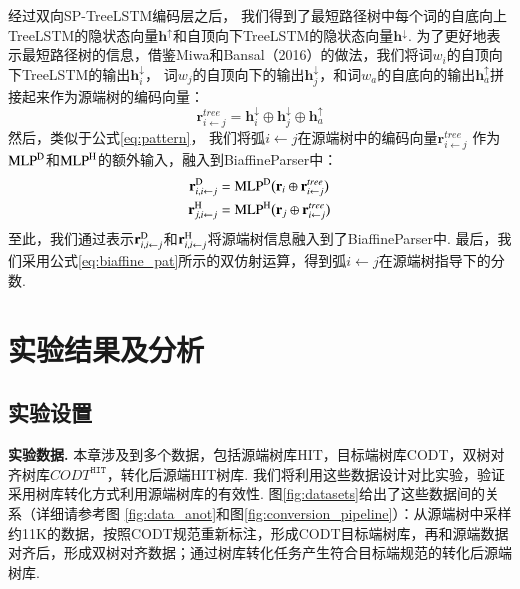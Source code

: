 经过双向SP-TreeLSTM编码层之后，
我们得到了最短路径树中每个词的自底向上TreeLSTM的隐状态向量$\mathbf{h}^{\uparrow}$和自顶向下TreeLSTM的隐状态向量$\mathbf{h}^{\downarrow}$.
为了更好地表示最短路径树的信息，借鉴Miwa和Bansal（2016）的做法，我们将词$w_i$的自顶向下TreeLSTM的输出$\mathbf{h}_i^{\downarrow}$，
词$w_j$的自顶向下的输出$\mathbf{h}_j^{\downarrow}$，和词$w_a$的自底向的输出$\mathbf{h}_a^{\uparrow}$拼接起来作为源端树的编码向量：
\begin{equation}
    \label{eq:sp_treelstm_rep}
    \mathbf{r}^{tree}_{i \leftarrow j} = \mathbf{h}_i^{\downarrow} \oplus \mathbf{h}_j^{\downarrow} \oplus \mathbf{h}_a^{\uparrow}
\end{equation}
然后，类似于公式\ref{eq:pattern}，
我们将弧$i \leftarrow j$在源端树中的编码向量$\mathbf{r}^{tree}_{i \leftarrow j}$
作为$\textup{MLP}^{\textup{D}}$和$\textup{MLP}^{\textup{H}}$的额外输入，融入到BiaffineParser中：
\begin{equation}\label{eq:mlp_treelstm}
    \begin{split}
        \mathbf{r}_{i,i \leftarrow j}^{\textup{D}} &={\textup{MLP}}^{\textup{D}} \big(\mathbf{r}_i \oplus \mathbf{r}^{tree}_{i  \leftarrow j} \big)  \\
        \mathbf{r}_{j,i\leftarrow j}^{\textup{H}} &= {\textup{MLP}}^{\textup{H}} \big(\mathbf{r}_j \oplus \mathbf{r}^{tree}_{i \leftarrow j} \big)
    \end{split}
\end{equation}
至此，我们通过表示$\mathbf{r}_{i,i \leftarrow j}^{\textup{D}}$和$\mathbf{r}_{i,i \leftarrow j}^{\textup{H}}$将源端树信息融入到了BiaffineParser中.
最后，我们采用公式\ref{eq:biaffine_pat}所示的双仿射运算，得到弧$i \leftarrow j$在源端树指导下的分数.

\section{实验结果及分析}

\subsection{实验设置}
\textbf{实验数据.  }
本章涉及到多个数据，包括源端树库HIT，目标端树库CODT，双树对齐树库$CODT^{\texttt{HIT}}$，转化后源端HIT树库. 我们将利用这些数据设计对比实验，验证采用树库转化方式利用源端树库的有效性.
图\ref{fig:datasets}给出了这些数据间的关系（详细请参考图
\ref{fig:data_anot}和图\ref{fig:conversion_pipeline}）：从源端树中采样约11K的数据，按照CODT规范重新标注，形成CODT目标端树库，再和源端数据对齐后，形成双树对齐数据；通过树库转化任务产生符合目标端规范的转化后源端树库.

